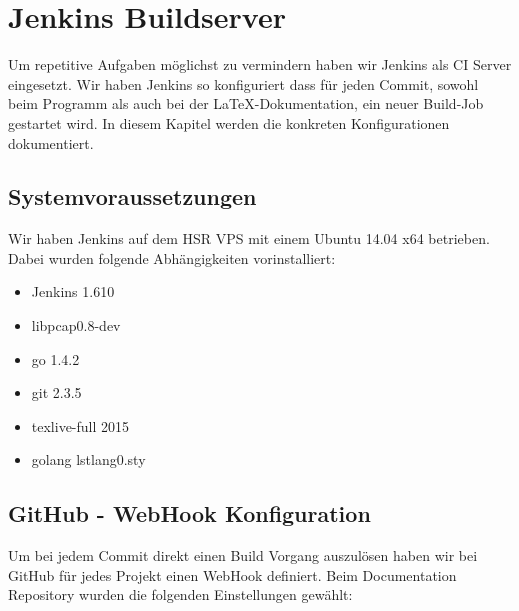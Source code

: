 \chapter{Jenkins Buildserver}
Um repetitive Aufgaben möglichst zu vermindern haben wir Jenkins als \acs{CI} Server eingesetzt. Wir haben Jenkins so konfiguriert dass für jeden Commit, sowohl beim Programm als auch bei der LaTeX-Dokumentation, ein neuer Build-Job gestartet wird.
In diesem Kapitel werden die konkreten Konfigurationen dokumentiert.

\section{Systemvoraussetzungen}
Wir haben Jenkins auf dem HSR VPS mit einem Ubuntu 14.04 x64 betrieben. Dabei wurden folgende Abhängigkeiten vorinstalliert:

\begin{itemize}
  \item Jenkins 1.610
  \item libpcap0.8-dev
  \item go 1.4.2
  \item git 2.3.5
  \item texlive-full 2015
  \item golang lstlang0.sty
\end{itemize}

\section{GitHub - WebHook Konfiguration}
Um bei jedem Commit direkt einen Build Vorgang auszulösen haben wir bei GitHub für jedes Projekt einen WebHook definiert. Beim Documentation Repository wurden die folgenden Einstellungen gewählt:

